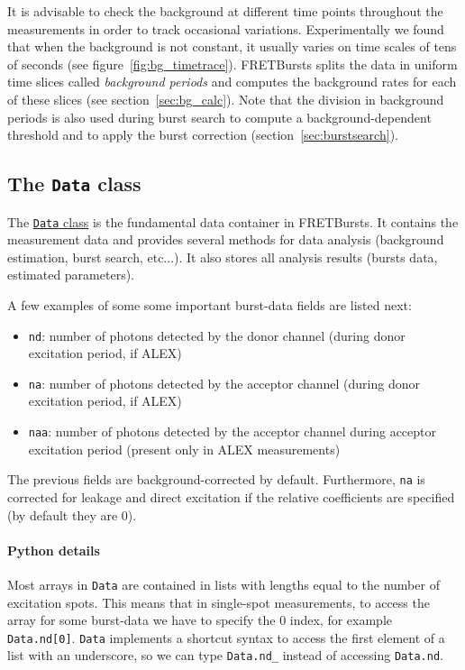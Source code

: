 It is advisable to check the background at different time points
throughout the measurements in order to track occasional variations.
Experimentally we found that when the background is not constant,
it usually varies
on time scales of tens of seconds (see figure~\ref{fig:bg_timetrace}).
FRETBursts splits the data in uniform time
slices called \textit{background periods} and computes the background rates for
each of these slices (see section~\ref{sec:bg_calc}).
Note that the division in background periods is also used during
burst search to compute a background-dependent
threshold and to apply the burst correction (section~\ref{sec:burstsearch}).

\subsection{The \texttt{Data} class}
\label{sec:data_intro}

The
\href{http://fretbursts.readthedocs.org/en/latest/data_class.html}{\texttt{Data}
class} is the fundamental data container in FRETBursts. It contains the
measurement data and provides several methods for data analysis (background
estimation, burst search, etc...). It also stores all analysis results
(bursts data, estimated parameters).

A few examples of some some important burst-data fields are listed next:

\begin{itemize}
\item \verb|nd|: number of photons detected by the donor channel
(during donor excitation period, if ALEX)
\item \verb|na|: number of photons detected by the acceptor channel
(during donor excitation period, if ALEX)
\item \verb|naa|: number of photons detected by the acceptor channel
during acceptor excitation period (present only in ALEX measurements)
\end{itemize}

The previous fields are background-corrected by default. Furthermore,
\verb|na| is corrected for leakage and direct excitation if the
relative coefficients are specified (by default they are 0).

\paragraph{Python details}

Most arrays in \texttt{Data} are contained in lists with lengths equal to the
number of excitation spots. This means that in
single-spot measurements, to access the array for some burst-data
we have to specify the 0 index, for example \verb|Data.nd[0]|.
\verb|Data| implements a shortcut syntax to access the first element of a list
with an underscore, so we can type
\verb|Data.nd_| instead of accessing \verb|Data.nd|.

